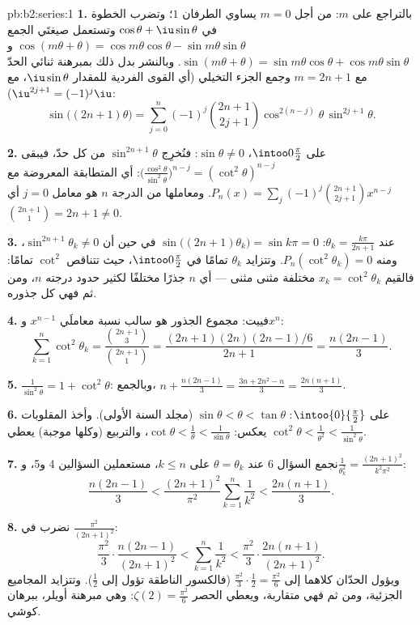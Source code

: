 \begin{solution}{pb:b2:series:1}
\textbf{1.} بالتراجع على $m$: من أجل $m = 0$ يساوي الطرفان $1$؛
وتضرب الخطوة في $\cos\theta + \iu\sin\theta$ وتستعمل
صيغتَي الجمع $\cos(m\theta + \theta) =
\cos m\theta\cos\theta - \sin m\theta\sin\theta$ و$\sin(m\theta
+ \theta) = \sin m\theta\cos\theta + \cos m\theta\sin\theta$.
وبالنشر بدل ذلك بمبرهنة ثنائي الحدّ مع $m = 2n+1$
وجمع الجزء التخيلي (أي القوى الفردية للمقدار
$\iu\sin\theta$، مع $\iu^{2j+1} = (-1)^j\iu$):
\[
\sin\bigl((2n{+}1)\theta\bigr) = \sum_{j=0}^{n}(-1)^j
\binom{2n+1}{2j+1}\cos^{2(n-j)}\theta\,\sin^{2j+1}\theta .
\]

\textbf{2.} على $\intoo0{\frac\pi2}$، $\sin\theta \neq 0$: فنُخرِج
$\sin^{2n+1}\theta$ من كل حدّ، فيبقى
$\bigl(\frac{\cos^2\theta}{\sin^2\theta}\bigr)^{n-j} =
(\cot^2\theta)^{n-j}$: أي المتطابقة المعروضة مع $P_n(x) =
\sum_j(-1)^j\binom{2n+1}{2j+1}x^{n-j}$. ومعاملها من الدرجة $n$
هو معامل $j = 0$ أي $\binom{2n+1}{1} = 2n + 1 \neq 0$.

\textbf{3.} عند $\theta_k = \frac{k\pi}{2n+1}$:
$\sin\bigl((2n{+}1)\theta_k\bigr) = \sin k\pi = 0$ في حين أن
$\sin^{2n+1}\theta_k \neq 0$، ومنه $P_n(\cot^2\theta_k) = 0$. وتتزايد
$\theta_k$ تمامًا في $\intoo0{\frac\pi2}$، حيث تتناقص
$\cot^2$ تمامًا: فالقيم $x_k =
\cot^2\theta_k$ مختلفة مثنى مثنى --- أي $n$ جذرًا مختلفًا
لكثير حدود درجته $n$، ومن ثم فهي كل جذوره.

\textbf{4.} فييت: مجموع الجذور هو سالب نسبة
معاملَي $x^{n-1}$ و$x^n$:
\[
\sum_{k=1}^{n}\cot^2\theta_k =
\frac{\binom{2n+1}{3}}{\binom{2n+1}{1}}
= \frac{(2n+1)(2n)(2n-1)/6}{2n+1} = \frac{n(2n-1)}{3}.
\]

\textbf{5.} $\frac{1}{\sin^2\theta} = 1 + \cot^2\theta$:
وبالجمع، $n + \frac{n(2n-1)}3 = \frac{3n + 2n^2 - n}{3} =
\frac{2n(n+1)}{3}$.

\textbf{6.} على $\intoo{0}{\frac\pi2}$: $\sin\theta < \theta <
\tan\theta$ (مجلد السنة الأولى). وأخذ المقلوبات يعكس:
$\cot\theta < \frac1\theta < \frac1{\sin\theta}$، والتربيع
(وكلها موجبة) يعطي $\cot^2\theta < \frac1{\theta^2} <
\frac1{\sin^2\theta}$.

\textbf{7.} نجمع السؤال 6 عند $\theta = \theta_k$ على $k \leq
n$، مستعملين السؤالين 4 و5، و$\frac1{\theta_k^2} =
\frac{(2n+1)^2}{k^2\pi^2}$:
\[
\frac{n(2n-1)}3 < \frac{(2n+1)^2}{\pi^2}\sum_{k=1}^n\frac1{k^2}
< \frac{2n(n+1)}3 .
\]

\textbf{8.} نضرب في $\frac{\pi^2}{(2n+1)^2}$:
\[
\frac{\pi^2}{3}\cdot\frac{n(2n-1)}{(2n+1)^2}
< \sum_{k=1}^{n}\frac1{k^2} <
\frac{\pi^2}{3}\cdot\frac{2n(n+1)}{(2n+1)^2}.
\]
ويؤول الحدّان كلاهما إلى $\frac{\pi^2}3\cdot\frac12 = \frac{\pi^2}6$
(فالكسور الناطقة تؤول إلى $\frac12$). وتتزايد المجاميع الجزئية،
ومن ثم فهي متقاربة، ويعطي الحصر $\zeta(2) =
\frac{\pi^2}6$: وهي مبرهنة أويلر، ببرهان كوشي.


\end{solution}
